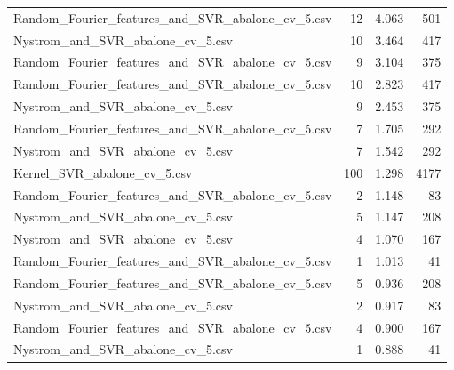 \begin{tabularx}{\textwidth}{lrrr}
Random\_Fourier\_features\_and\_SVR\_abalone\_cv\_5.csv &       12 &               4.063 &           501 \\
                Nystrom\_and\_SVR\_abalone\_cv\_5.csv &       10 &               3.464 &           417 \\
Random\_Fourier\_features\_and\_SVR\_abalone\_cv\_5.csv &        9 &               3.104 &           375 \\
Random\_Fourier\_features\_and\_SVR\_abalone\_cv\_5.csv &       10 &               2.823 &           417 \\
                Nystrom\_and\_SVR\_abalone\_cv\_5.csv &        9 &               2.453 &           375 \\
Random\_Fourier\_features\_and\_SVR\_abalone\_cv\_5.csv &        7 &               1.705 &           292 \\
                Nystrom\_and\_SVR\_abalone\_cv\_5.csv &        7 &               1.542 &           292 \\
                     Kernel\_SVR\_abalone\_cv\_5.csv &      100 &               1.298 &          4177 \\
Random\_Fourier\_features\_and\_SVR\_abalone\_cv\_5.csv &        2 &               1.148 &            83 \\
                Nystrom\_and\_SVR\_abalone\_cv\_5.csv &        5 &               1.147 &           208 \\
                Nystrom\_and\_SVR\_abalone\_cv\_5.csv &        4 &               1.070 &           167 \\
Random\_Fourier\_features\_and\_SVR\_abalone\_cv\_5.csv &        1 &               1.013 &            41 \\
Random\_Fourier\_features\_and\_SVR\_abalone\_cv\_5.csv &        5 &               0.936 &           208 \\
                Nystrom\_and\_SVR\_abalone\_cv\_5.csv &        2 &               0.917 &            83 \\
Random\_Fourier\_features\_and\_SVR\_abalone\_cv\_5.csv &        4 &               0.900 &           167 \\
                Nystrom\_and\_SVR\_abalone\_cv\_5.csv &        1 &               0.888 &            41 \\
\bottomrule
\end{tabularx}
